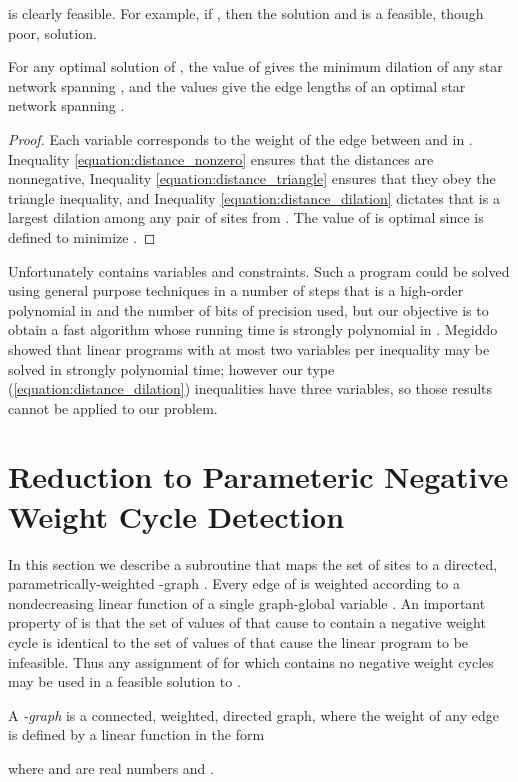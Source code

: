 \documentclass{llncs}
\begin{document}
\noindent  is clearly feasible.  For example, if , then the solution  and  is a feasible, though poor, solution.

\begin{lemma}
For any optimal solution of , the value of  gives the minimum dilation of any star network spanning , and the  values give the edge lengths of an optimal star network spanning .
\end{lemma}

\begin{proof}
Each variable  corresponds to the weight  of the edge between  and  in .  Inequality \ref{equation:distance_nonzero} ensures that the distances are nonnegative, Inequality
\ref{equation:distance_triangle} ensures that they obey the triangle inequality, and Inequality
\ref{equation:distance_dilation} dictates that  is a largest dilation among any pair of sites from .  The value of  is optimal since  is defined to minimize .
\end{proof}

Unfortunately  contains  variables and  constraints.  Such a program could be solved using general purpose techniques in a number of steps that is a high-order polynomial in  and the number of bits of precision used, but our objective is to obtain a fast algorithm whose running time is strongly polynomial in .  Megiddo showed \cite{megiddo:347} that linear programs with at most two variables per inequality may be solved in strongly polynomial time; however our type (\ref{equation:distance_dilation}) inequalities have three variables, so those results cannot be applied to our problem.

\section{Reduction to Parameteric Negative Weight Cycle Detection}
\label{section:reduction}

In this section we describe a subroutine that maps the set of sites  to a directed, parametrically-weighted -graph .  Every edge of  is weighted according to a nondecreasing linear function of a single graph-global variable .  An important property of  is that the set of values of  that cause  to contain a negative weight cycle is identical to the set of values of  that cause the linear program  to be infeasible.  Thus any assignment of  for which  contains no negative weight cycles may be used in a feasible solution to .

\begin{definition}
\label{definition:lambda_graph}
A \emph{-graph} is a connected, weighted, directed graph, where the weight  of any edge  is defined by a linear function in the form

\noindent where  and  are real numbers and .
\end{definition}
\end{document}
